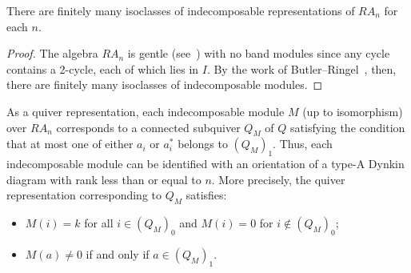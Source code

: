 \documentclass[ALCO,ThmDefs,Unicode,epreuves]{cedram}
\renewcommand{\1}{\hat{1}}
\newcommand{\0}{\hat{0}}
\begin{document}
\begin{proposition}
There are finitely many isoclasses of indecomposable representations
of $RA_n$ for each $n$.
\end{proposition}

\begin{proof}
The algebra $RA_n$ is gentle (see~\cite{AS}) with no band modules since any cycle contains a 2-cycle,
each of which lies in $I$. By the work of Butler--Ringel~\cite{Butler-Ringel},
then, there are finitely many isoclasses of indecomposable modules.
\end{proof}


As a quiver representation, each indecomposable module $M$ (up to
isomorphism) over $RA_n$ corresponds to a connected subquiver $Q_M$ of
$Q$ satisfying the condition that at most one of either $a_i$ or $a_i^*$ belongs to $(Q_M)_1$.
Thus, each indecomposable module can be identified with an orientation of a type-A Dynkin diagram with rank less than or equal to $n$.
More precisely, the quiver representation corresponding to $Q_M$ satisfies:
\begin{itemize}
\item $M(i)=k$ for all $i\in (Q_M)_0$ and $M(i)=0$ for $i\notin (Q_M)_0$;
\item $M(a)\neq 0$ if and only if $a\in (Q_M)_1$.
\end{itemize}


\end{document}
